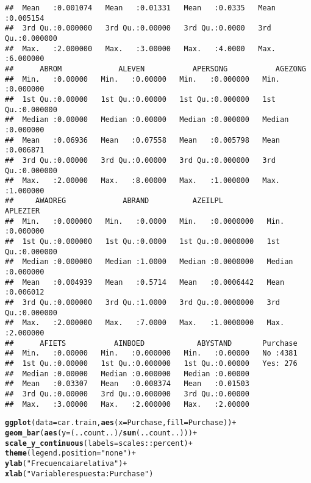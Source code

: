 \documentclass{article}\usepackage[]{graphicx}\usepackage[]{xcolor}
\makeatletter
\newcommand{\hlstr}[1]{\textcolor[rgb]{0.192,0.494,0.8}{#1}}%
\newcommand{\hlopt}[1]{\textcolor[rgb]{0,0,0}{#1}}%
\newcommand{\hlstd}[1]{\textcolor[rgb]{0.345,0.345,0.345}{#1}}%
\newcommand{\hlkwc}[1]{\textcolor[rgb]{0.333,0.667,0.333}{#1}}%
\newcommand{\hlkwd}[1]{\textcolor[rgb]{0.737,0.353,0.396}{\textbf{#1}}}%
\newenvironment{kframe}{%
 \def\at@end@of@kframe{}%
 \ifinner\ifhmode%
  \def\at@end@of@kframe{\end{minipage}}%
  \begin{minipage}{\columnwidth}%
 \fi\fi%
 \def\FrameCommand##1{\hskip\@totalleftmargin \hskip-\fboxsep
 \colorbox{shadecolor}{##1}\hskip-\fboxsep
     \hskip-\linewidth \hskip-\@totalleftmargin \hskip\columnwidth}%
 \MakeFramed {\advance\hsize-\width
   \@totalleftmargin\z@ \linewidth\hsize
   \@setminipage}}%
 {\par\unskip\endMakeFramed%
 \at@end@of@kframe}
\newenvironment{knitrout}{}{} %
\makeatother
\begin{document}
\begin{knitrout}
\begin{kframe}
\begin{verbatim}
##  Mean   :0.001074   Mean   :0.01331   Mean   :0.0335   Mean   :0.005154  
##  3rd Qu.:0.000000   3rd Qu.:0.00000   3rd Qu.:0.0000   3rd Qu.:0.000000  
##  Max.   :2.000000   Max.   :3.00000   Max.   :4.0000   Max.   :6.000000  
##      ABROM             ALEVEN           APERSONG           AGEZONG        
##  Min.   :0.00000   Min.   :0.00000   Min.   :0.000000   Min.   :0.000000  
##  1st Qu.:0.00000   1st Qu.:0.00000   1st Qu.:0.000000   1st Qu.:0.000000  
##  Median :0.00000   Median :0.00000   Median :0.000000   Median :0.000000  
##  Mean   :0.06936   Mean   :0.07558   Mean   :0.005798   Mean   :0.006871  
##  3rd Qu.:0.00000   3rd Qu.:0.00000   3rd Qu.:0.000000   3rd Qu.:0.000000  
##  Max.   :2.00000   Max.   :8.00000   Max.   :1.000000   Max.   :1.000000  
##     AWAOREG             ABRAND          AZEILPL             APLEZIER       
##  Min.   :0.000000   Min.   :0.0000   Min.   :0.0000000   Min.   :0.000000  
##  1st Qu.:0.000000   1st Qu.:0.0000   1st Qu.:0.0000000   1st Qu.:0.000000  
##  Median :0.000000   Median :1.0000   Median :0.0000000   Median :0.000000  
##  Mean   :0.004939   Mean   :0.5714   Mean   :0.0006442   Mean   :0.006012  
##  3rd Qu.:0.000000   3rd Qu.:1.0000   3rd Qu.:0.0000000   3rd Qu.:0.000000  
##  Max.   :2.000000   Max.   :7.0000   Max.   :1.0000000   Max.   :2.000000  
##      AFIETS           AINBOED            ABYSTAND       Purchase  
##  Min.   :0.00000   Min.   :0.000000   Min.   :0.00000   No :4381  
##  1st Qu.:0.00000   1st Qu.:0.000000   1st Qu.:0.00000   Yes: 276  
##  Median :0.00000   Median :0.000000   Median :0.00000             
##  Mean   :0.03307   Mean   :0.008374   Mean   :0.01503             
##  3rd Qu.:0.00000   3rd Qu.:0.000000   3rd Qu.:0.00000             
##  Max.   :3.00000   Max.   :2.000000   Max.   :2.00000
\end{verbatim}
\begin{alltt}
\hlkwd{ggplot}\hlstd{(}\hlkwc{data}\hlstd{=car.train,}\hlkwd{aes}\hlstd{(}\hlkwc{x}\hlstd{=Purchase,}\hlkwc{fill}\hlstd{=Purchase))} \hlopt{+}
  \hlkwd{geom_bar}\hlstd{(}\hlkwd{aes}\hlstd{(}\hlkwc{y}\hlstd{=(..count..)}\hlopt{/}\hlkwd{sum}\hlstd{(..count..)))} \hlopt{+}
  \hlkwd{scale_y_continuous}\hlstd{(}\hlkwc{labels}\hlstd{=scales}\hlopt{::}\hlstd{percent)} \hlopt{+}
  \hlkwd{theme}\hlstd{(}\hlkwc{legend.position}\hlstd{=}\hlstr{"none"}\hlstd{)} \hlopt{+}
  \hlkwd{ylab}\hlstd{(}\hlstr{"Frecuencaia relativa"}\hlstd{)} \hlopt{+}
  \hlkwd{xlab}\hlstd{(}\hlstr{"Variable respuesta: Purchase"}\hlstd{)}
\end{alltt}
\end{kframe}


\end{knitrout}
\end{document}
